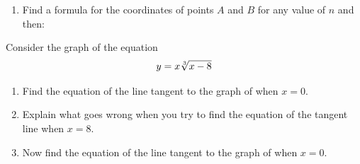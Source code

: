 \begin{embeddedproblem}
\begin{enumerate}[label={\bf{}(\alph*)}]{}
\begin{enumerate}[label={\bf{}(\roman*)}]{}
      \end{enumerate}
    \item Find a  formula for  the  coordinates of points  $A$ and
      $B$ for any value of $n$ and then:
      \begin{enumerate}[label={\bf{}(\roman*)}]{}
      \end{enumerate}
    \end{enumerate}
  \end{embeddedproblem}

     
\begin{embeddedproblem}
  \label{problem:underl-tang-line}
  Consider the graph of the equation
  $$
  y=x\sqrt[3]{x-8}\\
  $$
  \begin{enumerate}[label={\bf{}(\alph*)}]
  \item Find the equation of the line tangent to the graph of
      when $x=0$.  
    \item Explain what goes wrong when you try to find the equation of
      the tangent line when $x=8$.\\
    \item Now find the equation of the line tangent to the graph of
      when $x=0$.  
    \end{enumerate}
  \end{embeddedproblem}
  



